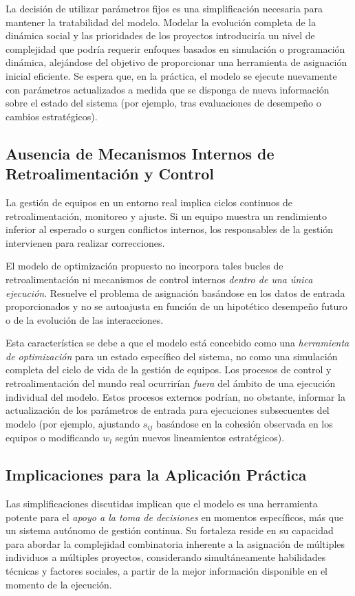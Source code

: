 \documentclass[conference]{IEEEtran}
\begin{document}
La decisión de utilizar parámetros fijos es una simplificación necesaria para mantener la tratabilidad del modelo. Modelar la evolución completa de la dinámica social y las prioridades de los proyectos introduciría un nivel de complejidad que podría requerir enfoques basados en simulación o programación dinámica, alejándose del objetivo de proporcionar una herramienta de asignación inicial eficiente. Se espera que, en la práctica, el modelo se ejecute nuevamente con parámetros actualizados a medida que se disponga de nueva información sobre el estado del sistema (por ejemplo, tras evaluaciones de desempeño o cambios estratégicos).

\subsection{Ausencia de Mecanismos Internos de Retroalimentación y Control}
La gestión de equipos en un entorno real implica ciclos continuos de retroalimentación, monitoreo y ajuste. Si un equipo muestra un rendimiento inferior al esperado o surgen conflictos internos, los responsables de la gestión intervienen para realizar correcciones.

El modelo de optimización propuesto no incorpora tales bucles de retroalimentación ni mecanismos de control internos \textit{dentro de una única ejecución}. Resuelve el problema de asignación basándose en los datos de entrada proporcionados y no se autoajusta en función de un hipotético desempeño futuro o de la evolución de las interacciones.

Esta característica se debe a que el modelo está concebido como una \textit{herramienta de optimización} para un estado específico del sistema, no como una simulación completa del ciclo de vida de la gestión de equipos. Los procesos de control y retroalimentación del mundo real ocurrirían \textit{fuera} del ámbito de una ejecución individual del modelo. Estos procesos externos podrían, no obstante, informar la actualización de los parámetros de entrada para ejecuciones subsecuentes del modelo (por ejemplo, ajustando $s_{ij}$ basándose en la cohesión observada en los equipos o modificando $w_l$ según nuevos lineamientos estratégicos).

\subsection{Implicaciones para la Aplicación Práctica}
Las simplificaciones discutidas implican que el modelo es una herramienta potente para el \textit{apoyo a la toma de decisiones} en momentos específicos, más que un sistema autónomo de gestión continua. Su fortaleza reside en su capacidad para abordar la complejidad combinatoria inherente a la asignación de múltiples individuos a múltiples proyectos, considerando simultáneamente habilidades técnicas y factores sociales, a partir de la mejor información disponible en el momento de la ejecución.
\end{document}

